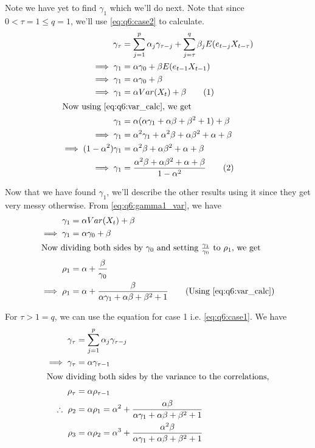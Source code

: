 \documentclass[12pt, oneside]{article}
\newcommand\numberthis{\addtocounter{equation}{1}\tag{\theequation}}
\begin{document}
\begin{enumerate}
{    Note we have yet to find \(\gamma_1\) which we'll do next. Note that since \(0 < \tau = 1 \leq q = 1\),
    we'll use \eqref{eq:q6:case2} to calculate.
    \begin{align*}
        \gamma_{\tau} &= \sum_{j=1}^{p}\alpha_j \gamma_{\tau - j} + \sum_{j=\tau}^{q} \beta_j E(e_{t-j} X_{t-\tau}) \\
        \implies \gamma_1 &= \alpha \gamma_0 + \beta E(e_{t-1} X_{t-1}) \\
        \implies \gamma_1 &= \alpha \gamma_0 + \beta \\
        \implies \gamma_1 &= \alpha Var(X_t) + \beta \numberthis \label{eq:q6:gamma1_var} \\
        \intertext{Now using \eqref{eq:q6:var_calc}, we get}
        \gamma_1 &= \alpha (\alpha \gamma_1 + \alpha \beta + \beta^2 + 1) + \beta \\
        \implies \gamma_1 &= \alpha^2 \gamma_1 + \alpha^2 \beta + \alpha \beta^2 + \alpha + \beta \\
        \implies (1 - \alpha^2) \gamma_1 &= \alpha^2 \beta + \alpha \beta^2 + \alpha + \beta \\
        \implies \gamma_1 &= \frac{\alpha^2 \beta + \alpha \beta^2 + \alpha + \beta}{1 - \alpha^2} 
            \numberthis \label{eq:q6:gamma1_ans}
    \end{align*}

    Now that we have found \(\gamma_1\), we'll describe the other results using it since
    they get very messy otherwise. From \eqref{eq:q6:gamma1_var}, we have
    \begin{align*}
        \gamma_1 &= \alpha Var(X_t) + \beta \\
        \implies \gamma_1 &= \alpha \gamma_0 + \beta \\
        \intertext{Now dividing both sides by \(\gamma_0\) and setting \(\frac{\gamma_1}{\gamma_0}\) to \(\rho_1\), we get}
        \rho_1 &= \alpha + \frac{\beta}{\gamma_0} \\
        \implies \rho_1 &= \alpha + \frac{\beta}{ \alpha \gamma_1 + \alpha \beta + \beta^2 + 1} \tag*{(Using \eqref{eq:q6:var_calc})}
    \end{align*}

    For \(\tau > 1 = q\), we can use the equation for case 1 i.e. \eqref{eq:q6:case1}. We have
    \begin{align*}
        \gamma_{\tau} &= \sum_{j=1}^{p}\alpha_j \gamma_{\tau - j} \\
        \implies \gamma_\tau &= \alpha \gamma_{\tau-1} \\
        \intertext{Now dividing both sides by the variance to the correlations,}
        \rho_\tau &= \alpha \rho_{\tau-1} \\
        \therefore~ \rho_2 &= \alpha \rho_1 = \alpha^2 + \frac{\alpha \beta}{ \alpha \gamma_1 + \alpha \beta + \beta^2 + 1} \\
        \rho_3 &= \alpha \rho_2 = \alpha^3 + \frac{\alpha^2 \beta}{ \alpha \gamma_1 + \alpha \beta + \beta^2 + 1}
    \end{align*}

}
\end{enumerate}
\end{document}
